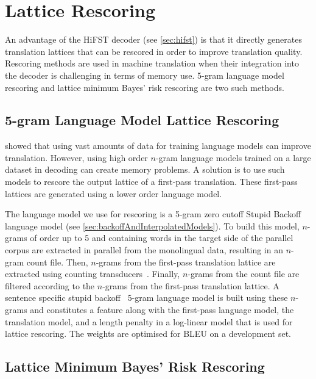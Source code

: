 \section{Lattice Rescoring}
\label{sec:rescoring}

An advantage of the HiFST decoder (see \autoref{sec:hifst}) is that it directly %
generates translation lattices that can be rescored in order to improve translation quality.
Rescoring methods are used in machine translation when their integration into the decoder
is challenging in terms of memory use. 5-gram language model rescoring and lattice minimum
Bayes' risk rescoring are two such methods.

\subsection{5-gram Language Model Lattice Rescoring}
\label{sec:background5gRescoring}

\citet{brants-popat-xu-och-dean:2007:EMNLP-CoNLL} showed that using vast
amounts of data for training language models can improve translation. However,
using high order $n$-gram language models trained on
a large dataset in decoding can create memory problems. %
A solution is to use such models to rescore the output
lattice of a first-pass translation. These first-pass lattices are generated
using a lower
order language model.

The language model we use for rescoring is a 5-gram zero cutoff Stupid Backoff language
model (see \autoref{sec:backoffAndInterpolatedModels}).
To build this model, $n$-grams of order up to 5 and containing words in the target side of the parallel corpus 
are extracted in parallel from the monolingual data, resulting in an $n$-gram count file.
Then, $n$-grams from the first-pass translation lattice 
are extracted using counting transducers~\citep{allauzen:03}.
Finally, $n$-grams from the count file are filtered according to the $n$-grams from the first-pass 
translation lattice. A sentence specific stupid backoff~\citep{brants-popat-xu-och-dean:2007:EMNLP-CoNLL}
5-gram language model is built using these $n$-grams and constitutes a feature along with the first-pass
language model, the translation model, and a length penalty in a log-linear model that is used
for lattice rescoring. The weights are optimised for BLEU on a development set.

\subsection{Lattice Minimum Bayes' Risk Rescoring} \label{sec:lmbr}

